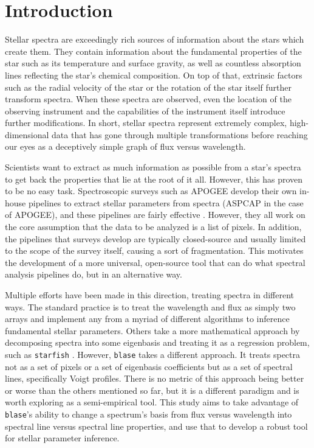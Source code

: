 \documentclass[twocolumn]{aastex631}
\begin{document}
\section{Introduction}
Stellar spectra are exceedingly rich sources of information about the stars
which create them. They contain information about the fundamental properties
of the star such as its temperature and surface gravity, as well as
countless absorption lines reflecting the star's chemical composition. On 
top of that, extrinsic factors such as the radial velocity of the star or 
the rotation of the star itself further transform spectra. When these spectra
are observed, even the location of the observing instrument and the 
capabilities of the instrument itself introduce further modifications. 
In short, stellar spectra represent extremely complex, high-dimensional 
data that has gone through multiple transformations before reaching our 
eyes as a deceptively simple graph of flux versus wavelength.

Scientists want to extract as much information as possible from
a star's spectra to get back the properties that lie at the root of it all. 
However, this has proven to be no easy task. Spectroscopic surveys such as 
APOGEE develop their own in-house pipelines to extract stellar parameters
from spectra (ASPCAP in the case of APOGEE), and these pipelines are fairly
effective \citep{APOGEE, ASPCAP}. However, they all work on the core assumption that the data to be 
analyzed is a list of pixels. In addition, the pipelines that surveys 
develop are typically closed-source and usually limited to the scope of the 
survey itself, causing a sort of fragmentation. This motivates the 
development of a more universal, open-source tool that can do what spectral 
analysis pipelines do, but in an alternative way. 

Multiple efforts have been made in this direction, treating spectra in 
different ways. The standard practice is to treat the wavelength and flux as 
simply two arrays and implement any from a myriad of different algorithms to 
inference fundamental stellar parameters. Others take a more mathematical 
approach by decomposing spectra into some eigenbasis and treating it as a 
regression problem, such as \texttt{starfish} \citep{starfish}. However, \texttt{blase} takes 
a different approach. It treats spectra not as a set of pixels or a set of 
eigenbasis coefficients but as a set of spectral lines, specifically Voigt 
profiles. There is no metric of this approach being better or worse than the 
others mentioned so far, but it is a different paradigm and is worth 
exploring as a semi-empirical tool. This study aims to take advantage of 
\texttt{blase}'s ability to change a spectrum's basis from flux versus 
wavelength into spectral line versus spectral line properties, and use that 
to develop a robust tool for stellar parameter inference.
\end{document}
